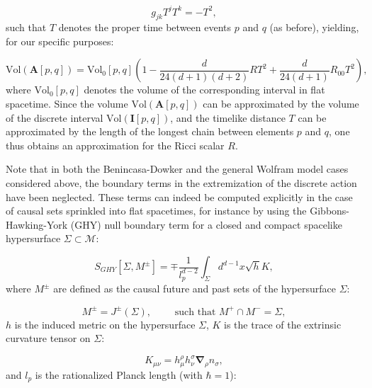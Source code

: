 \documentclass{article}
\begin{document}
\begin{equation}
g_{j k} T^j T^k = - T^2,
\end{equation}
such that $T$ denotes the proper time between events $p$ and $q$ (as before), yielding, for our specific purposes:

\begin{equation}
\mathrm{Vol} \left( \mathbf{A} \left[ p, q \right] \right) = \mathrm{Vol}_0 \left[ p, q \right] \left( 1 - \frac{d}{24 \left( d + 1 \right) \left( d + 2 \right)} R T^2 + \frac{d}{24 \left( d + 1 \right)} R_{0 0} T^2 \right),
\end{equation}
where ${\mathrm{Vol}_0 \left[ p, q \right]}$ denotes the volume of the corresponding interval in flat spacetime. Since the volume ${\mathrm{Vol} \left( \mathbf{A} \left[ p, q \right] \right)}$ can be approximated by the volume of the discrete interval ${\mathrm{Vol} \left( \mathbf{I} \left[ p, q \right] \right)}$, and the timelike distance $T$ can be approximated by the length of the longest chain between elements $p$ and $q$, one thus obtains an approximation for the Ricci scalar $R$.

Note that in both the Benincasa-Dowker and the general Wolfram model cases considered above, the boundary terms in the extremization of the discrete action have been neglected. These terms can indeed be computed explicitly in the case of causal sets sprinkled into flat spacetimes\cite{buck}, for instance by using the Gibbons-Hawking-York (GHY)\cite{gibbons2}\cite{york}\cite{jubb}\cite{lehner} null boundary term for a closed and compact spacelike hypersurface ${\Sigma \subset \mathcal{M}}$:

\begin{equation}
S_{GHY} \left[ \Sigma, M^{\pm} \right] = \mp \frac{1}{l_{p}^{d - 2}} \int_{\Sigma} d^{d - 1} x \sqrt{h} K,
\end{equation}
where ${M^{\pm}}$ are defined as the causal future and past sets of the hypersurface ${\Sigma}$:

\begin{equation}
M^{\pm} = J^{\pm} \left( \Sigma \right), \qquad \text{ such that } M^{+} \cap M^{-} = \Sigma,
\end{equation}
$h$ is the induced metric on the hypersurface ${\Sigma}$, $K$ is the trace of the extrinsic curvature tensor on ${\Sigma}$:

\begin{equation}
K_{\mu \nu} = h_{\mu}^{\rho} h_{\nu}^{\sigma} \boldsymbol\nabla_{\rho} n_{\sigma},
\end{equation}
and ${l_p}$ is the rationalized Planck length (with ${\hbar = 1}$):
\end{document}
